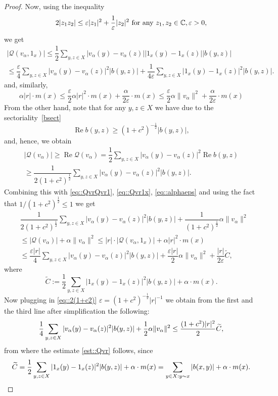 \documentclass[a4paper,11pt]{amsart}
\theoremstyle{definition}
\renewcommand{\Re}{\operatorname{Re}}%
\begin{document}
\begin{proof}
Now, using the inequality
$$2|z_1 z_2 | \le\varepsilon |z_1|^2 +\dfrac{1}{\varepsilon} |z_2 |^2 \mbox{ for any  }z_1 , z_2 \in  \Bbb C, \varepsilon>0,$$
we get
\begin{multline}\label{eq::Qvr1x}
|\mathcal  Q(v_\alpha,1_x)|\le \dfrac12\sum_{y,z\in X}|v_\alpha(y)-v_\alpha(z)||1_x(y)-1_x(z)||b(y,z)|\\\le \dfrac{\varepsilon}{4}\sum_{y,z\in X}|v_\alpha(y)-v_\alpha(z)|^2|b(y,z)|+\dfrac{1}{4\varepsilon}\sum_{y,z\in X}|1_x(y)-1_x(z)|^2|b(y,z)|.
\end{multline}
and, similarly, 
\begin{equation}\label{eq::alphaeps}
\alpha |r|\cdot m(x)\le   \dfrac{\varepsilon}{2}\alpha|r|^2 \cdot m(x)+ \dfrac{\alpha}{2\varepsilon}\cdot m(x)\le   \dfrac{\varepsilon}{2}\alpha \|v_\alpha\|^2+ \dfrac{\alpha}{2\varepsilon}\cdot m(x)
\end{equation}
From the other hand, note that for any $y,z\in X$ we have due to the sectoriality~\eqref{bsect}
$$
\Re b(y,z)\ge (1+c^2)^{-\frac12}|b(y,z)|,
$$
 and, hence, we obtain
\begin{multline*}
|\mathcal  Q(v_\alpha)| \ge \Re \mathcal  Q(v_\alpha)=\dfrac12\sum_{y,z\in X}|v_\alpha(y)-v_\alpha(z)|^2 \Re b(y,z)\\\ge \dfrac{1}{2(1+c^2)^{\frac12}}\sum_{y,z\in X}|v_\alpha(y)-v_\alpha(z)|^2 |b(y,z)|. 
\end{multline*}
Combining this with \eqref{eq::QvrQvr1}, \eqref{eq::Qvr1x}, \eqref{eq::alphaeps} and using the fact that $1/(1+c^2)^\frac12\le 1$ we get
\begin{align}\label{eq::2(1+c2)}
&\dfrac{1}{2(1+c^2)^{\frac12}}\sum_{y,z\in X}|v_\alpha(y)-v_\alpha(z)|^2 |b(y,z)|+\dfrac{1}{(1+c^2)^{\frac12}}\alpha \|v_\alpha\|^2\nonumber\\
&\le|\mathcal  Q(v_\alpha)| +\alpha \|v_\alpha\|^2\le
 |r|\cdot|\mathcal  Q(v_\alpha,1_x)|+\alpha|r|^2\cdot m(x) 
\\& \le\dfrac{\varepsilon |r|}{4}\sum_{y,z\in X}|v_\alpha(y)-v_\alpha(z)|^2|b(y,z)|+   \dfrac{\varepsilon |r|}{2}\alpha \|v_\alpha\|^2+\dfrac{|r|}{2\varepsilon}\widetilde C \nonumber,
\end{align}
where
$$\widetilde C:=\dfrac12\sum_{y,z\in X}|1_x(y)-1_x(z)|^2|b(y,z)|+\alpha\cdot m(x).
$$
 Now plugging in \eqref{eq::2(1+c2)} $\varepsilon=(1+c^2)^{-\frac12}|r|^{-1}$ 
we obtain from the first and the third line after simplification the following:
\begin{equation*}
\dfrac{1}{4}\sum_{y,z\in X}|v_\alpha(y)-v_\alpha(z)|^2 |b(y,z)|+\dfrac{1}{2}\alpha \|v_\alpha\|^2\\\le\dfrac{(1+c^2)|r|^2}{2}\widetilde C,
\end{equation*}
from where the estimate \eqref{est::Qvr} follows, since 
$$
\widetilde C=\frac12\sum_{y,z\in X}|1_x(y)-1_x(z)|^2|b(y,z)|+\alpha\cdot m(x)=\sum_{\substack {y\in X:}\\{y\sim x}}|b(x,y)|+\alpha\cdot m(x).
$$
\end{proof}
\end{document}
